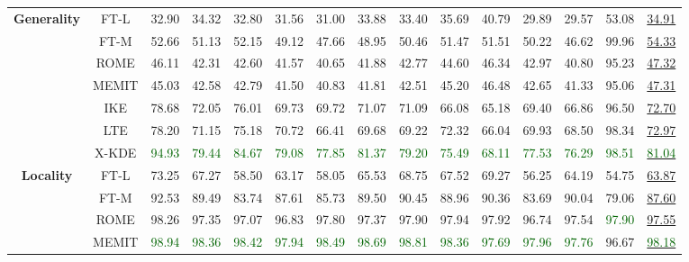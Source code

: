 \begin{table*}[!h]
{\begin{tabular}{ccccccccccccccc}
           \midrule
           \multirow{7}{*}{\textbf{Generality}} 
            & FT-L & 32.90 & 34.32 & 32.80 & 31.56 & 31.00 & 33.88 & 33.40 & 35.69 & 40.79 & 29.89 & 29.57 & 53.08 & \underline{34.91} \\
            & FT-M & 52.66 & 51.13 & 52.15 & 49.12 & 47.66 & 48.95 & 50.46 & 51.47 & 51.51 & 50.22 & 46.62 &  99.96 & \underline{54.33} \\
            & ROME & 46.11 & 42.31 & 42.60 & 41.57 & 40.65 & 41.88 & 42.77 & 44.60 & 46.34 & 42.97 & 40.80 & 95.23 & \underline{47.32} \\
            & MEMIT & 45.03 & 42.58 & 42.79 & 41.50 & 40.83 & 41.81 & 42.51 & 45.20 & 46.48 & 42.65 & 41.33 & 95.06 & \underline{47.31} \\
            & IKE & 78.68 & 72.05 & 76.01 & 69.73 & 69.72 & 71.07 & 71.09 & 66.08 & 65.18 & 69.40 & 66.86 & 96.50 & \underline{72.70} \\
            & LTE & 78.20 & 71.15 & 75.18 & 70.72 & 66.41 & 69.68 & 69.22 & 72.32 & 66.04 & 69.93 & 68.50 & 98.34 & \underline{72.97} \\
           \cmidrule{2-15}
            & X-KDE  & \textcolor{darkgreen}{94.93} & \textcolor{darkgreen}{79.44 }& \textcolor{darkgreen}{84.67 }& \textcolor{darkgreen}{79.08 }& \textcolor{darkgreen}{77.85 }& \textcolor{darkgreen}{81.37} &\textcolor{darkgreen}{ 79.20} & \textcolor{darkgreen}{75.49} &\textcolor{darkgreen}{ 68.11 }& \textcolor{darkgreen}{77.53 }& \textcolor{darkgreen}{76.29} & \textcolor{darkgreen}{98.51 }& \underline{\textcolor{darkgreen}{81.04}} \\
           \midrule
           \multirow{7}{*}{\textbf{Locality}} 
            & FT-L & 73.25 & 67.27 & 58.50 & 63.17 & 58.05 & 65.53 & 68.75 & 67.52 & 69.27 & 56.25 & 64.19 & 54.75 & \underline{63.87} \\
            & FT-M & 92.53 & 89.49 & 83.74 & 87.61 & 85.73 & 89.50 & 90.45 & 88.96 & 90.36 & 83.69 & 90.04 &  79.06 & \underline{87.60} \\
            & ROME & 98.26 & 97.35 & 97.07 & 96.83 & 97.80 & 97.37 & 97.90 & 97.94 & 97.92 & 96.74 & 97.54 &\textcolor{darkgreen}{ 97.90} & \underline{97.55} \\
            & MEMIT &\textcolor{darkgreen}{ 98.94} & \textcolor{darkgreen}{98.36} & \textcolor{darkgreen}{98.42 }&\textcolor{darkgreen}{ 97.94} & \textcolor{darkgreen}{98.49 }& \textcolor{darkgreen}{98.69 }& \textcolor{darkgreen}{98.81} &\textcolor{darkgreen}{ 98.36} & \textcolor{darkgreen}{97.69 }& \textcolor{darkgreen}{97.96} & \textcolor{darkgreen}{97.76} & 96.67 & \underline{\textcolor{darkgreen}{98.18}} \\

\end{tabular}}
\end{table*}
